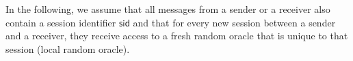 \begin{remark}
In the following, we assume that all messages from a sender or a receiver also contain a session identifier $\mathsf{sid}$ and that for every new session between a sender and a receiver, they receive access to a fresh random oracle that is unique to that session (local random oracle).  
\end{remark}

